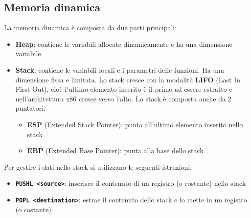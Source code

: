\documentclass[a4paper]{article}
\theoremstyle{break}
\theoremstyle{break}
\theoremstyle{break}
\theoremstyle{break}
\begin{document}
\subsection{Memoria dinamica}
La memoria dinamica è composta da due parti principali:
\begin{itemize}
	\item \textbf{Heap}: contiene le variabili allocate dinamicamente e ha una dimensione variabile
	\item \textbf{Stack}: contiene le variabili locali e i parametri delle funzioni. Ha una dimensione fissa
	      e limitata. Lo stack cresce con la modalità \textbf{LIFO} (Last In First Out), cioè l'ultimo
	      elemento inserito è il primo ad essere estratto e nell'architettura x86 cresce verso l'alto.
	      Lo stack è composta anche da 2 puntatori:
	      \begin{itemize}
		      \item \textbf{ESP} (Extended Stack Pointer): punta all'ultimo elemento inserito nello stack
		      \item \textbf{EBP} (Extended Base Pointer): punta alla base dello stack
	      \end{itemize}
\end{itemize}

\begin{figure}[H]
	\centering
\end{figure}

\noindent Per gestire i dati nello stack si utilizzano le seguenti istruzioni:
\begin{itemize}
	\item \textbf{\texttt{PUSHL <source>}}: inserisce il contenuto di un registro (o costante) nello stack
	\item \textbf{\texttt{POPL <destination>}}: estrae il contenuto dello stack e lo mette in un registro (o costante)
\end{itemize}
\end{document}
